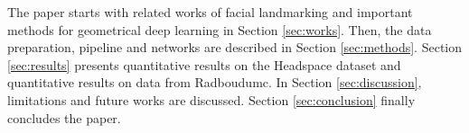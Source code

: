 The paper starts with related works of facial landmarking and important methods for geometrical deep learning in Section \ref{sec:works}. Then, the data preparation, pipeline and networks are described in Section \ref{sec:methods}. Section \ref{sec:results} presents quantitative results on the Headspace dataset and quantitative results on data from Radboudumc. In Section \ref{sec:discussion}, limitations and future works are discussed. Section \ref{sec:conclusion} finally concludes the paper.


